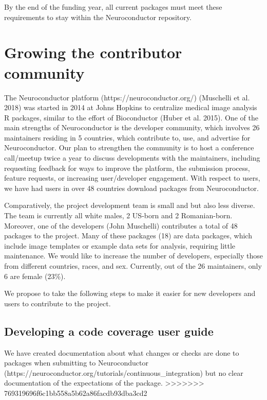 \documentclass[]{elsarticle} %
\begin{document}
By the end of the funding year, all current packages must meet these
requirements to stay within the Neuroconductor repository.

\section{Growing the contributor
community}\label{growing-the-contributor-community}

The Neuroconductor platform (https://neuroconductor.org/) (Muschelli et
al. 2018) was started in 2014 at Johns Hopkins to centralize medical
image analysis R packages, similar to the effort of Bioconductor (Huber
et al. 2015). One of the main strengths of Neuroconductor is the
developer community, which involves 26 maintainers residing in 5
countries, which contribute to, use, and advertise for Neuroconductor.
Our plan to strengthen the community is to host a conference call/meetup
twice a year to discuss developments with the maintainers, including
requesting feedback for ways to improve the platform, the submission
process, feature requests, or increasing user/developer engagement. With
respect to users, we have had users in over 48 countries download
packages from Neuroconductor.

Comparatively, the project development team is small and but also less
diverse. The team is currently all white males, 2 US-born and 2
Romanian-born. Moreover, one of the developers (John Muschelli)
contributes a total of 48 packages to the project. Many of these
packages (18) are data packages, which include image templates or
example data sets for analysis, requiring little maintenance. We would
like to increase the number of developers, especially those from
different countries, races, and sex. Currently, out of the 26
maintainers, only 6 are female (23\%).

We propose to take the following steps to make it easier for new
developers and users to contribute to the project.

\subsection{Developing a code coverage user
guide}\label{developing-a-code-coverage-user-guide}

We have created documentation about what changes or checks are done to
packages when submitting to Neuroconductor
(https://neuroconductor.org/tutorials/continuous\_integration) but no
clear documentation of the expectations of the package.
>>>>>>> 769319696f6c1bb558a5b62a86facdb93dba3cd2
\end{document}
